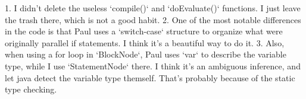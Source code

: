 1. I didn't delete the useless `compile()` and `doEvaluate()` functions. I just leave the trash there,
which is not a good habit.
2. One of the most notable differences in the code is that Paul uses a `switch-case` structure to
organize what were originally parallel if statements. I think it's a beautiful way to do it.
3. Also, when using a for loop in `BlockNode`, Paul uses `var` to describe the variable type,
while I use `StatementNode` there. I think it's an ambiguous inference, and let java detect the
variable type themself. That's probably because of the static type checking.


